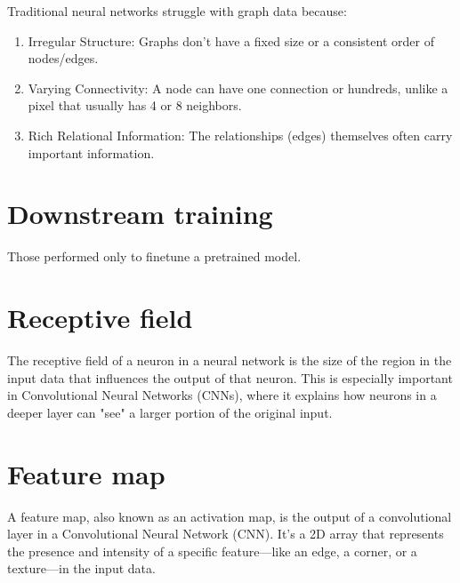 Traditional neural networks struggle with graph data because:
\begin{enumerate}
\item Irregular Structure: Graphs don't have a fixed size or a
  consistent order of nodes/edges.
\item Varying Connectivity: A node can have one connection or
  hundreds, unlike a pixel that usually has 4 or 8 neighbors.
\item Rich Relational Information: The relationships (edges)
  themselves often carry important information.
\end{enumerate}

\section{Downstream training}
Those performed only to finetune a pretrained model.

\section{Receptive field}
The receptive field of a neuron in a neural network is the size of the
region in the input data that influences the output of that
neuron. This is especially important in Convolutional Neural Networks
(CNNs), where it explains how neurons in a deeper layer can "see" a
larger portion of the original input.

\section{Feature map}
A feature map, also known as an activation map, is the output of a
convolutional layer in a Convolutional Neural Network (CNN). It's a 2D
array that represents the presence and intensity of a specific
feature—like an edge, a corner, or a texture—in the input data.
